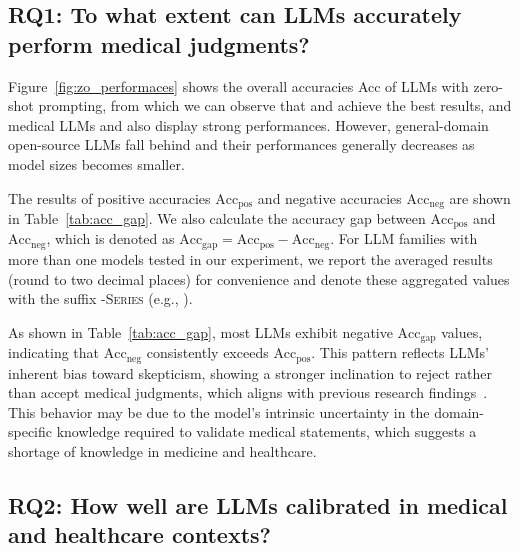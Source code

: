 
\subsection{RQ1: To what extent can LLMs accurately perform medical judgments?}
\label{sec:rq1}
Figure~\ref{fig:zo_performaces} shows the overall accuracies Acc of LLMs with zero-shot prompting, from which we can observe that \gptfouro and \gptfour achieve the best results, and medical LLMs \mellama and \meditron also display strong performances. However, general-domain open-source LLMs fall behind and their performances generally decreases as model sizes becomes smaller.



The results of positive accuracies $\text{Acc}_\text{pos}$ and negative accuracies $\text{Acc}_\text{neg}$ are shown in Table~\ref{tab:acc_gap}. 
We also calculate the accuracy gap between $\text{Acc}_\text{pos}$ and $\text{Acc}_\text{neg}$, which is denoted as $\text{Acc}_\text{gap} = \text{Acc}_\text{pos} - \text{Acc}_\text{neg}$. 
For LLM families with more than one models tested in our experiment, we report the averaged results (round to two decimal places) for convenience and denote these aggregated values with the suffix \textsc{-Series} (e.g., \llamas).

As shown in Table~\ref{tab:acc_gap}, most LLMs exhibit negative $\text{Acc}_\text{gap}$ values, indicating that $\text{Acc}_\text{neg}$ consistently exceeds $\text{Acc}_\text{pos}$. 
This pattern reflects LLMs' inherent bias toward skepticism, showing a stronger inclination to reject rather than accept medical judgments, which aligns with previous research findings~\cite{sun-etal-2024-head, xiong2024can}. 
This behavior may be due to the model’s intrinsic uncertainty in the domain-specific knowledge required to validate medical statements, which suggests a shortage of knowledge in medicine and healthcare. 


\subsection{RQ2: How well are LLMs calibrated in medical and healthcare contexts?}
\label{sec:rq2_calibration}

